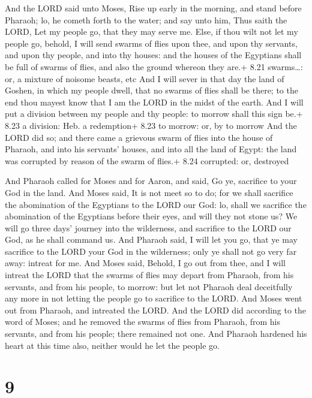  And the LORD said unto Moses, Rise up early in the
morning, and stand before Pharaoh; lo, he cometh forth to the water; and
say unto him, Thus saith the LORD, Let my people go, that they may serve
me.  Else, if thou wilt not let my people go, behold, I
will send swarms of flies upon thee, and upon thy servants, and upon thy
people, and into thy houses: and the houses of the Egyptians shall be
full of swarms of flies, and also the ground whereon they are.+ 8.21
swarms\ldots: or, a mixture of noisome beasts, etc  And I
will sever in that day the land of Goshen, in which my people dwell,
that no swarms of flies shall be there; to the end thou mayest know that
I am the LORD in the midst of the earth.  And I will put a
division between my people and thy people: to morrow shall this sign
be.+ 8.23 a division: Heb. a redemption+ 8.23 to morrow: or, by to
morrow  And the LORD did so; and there came a grievous
swarm of flies into the house of Pharaoh, and into his servants' houses,
and into all the land of Egypt: the land was corrupted by reason of the
swarm of flies.+ 8.24 corrupted: or, destroyed

 And Pharaoh called for Moses and for Aaron, and said, Go
ye, sacrifice to your God in the land.  And Moses said, It
is not meet so to do; for we shall sacrifice the abomination of the
Egyptians to the LORD our God: lo, shall we sacrifice the abomination of
the Egyptians before their eyes, and will they not stone us?
 We will go three days' journey into the wilderness, and
sacrifice to the LORD our God, as he shall command us.  And
Pharaoh said, I will let you go, that ye may sacrifice to the LORD your
God in the wilderness; only ye shall not go very far away: intreat for
me.  And Moses said, Behold, I go out from thee, and I will
intreat the LORD that the swarms of flies may depart from Pharaoh, from
his servants, and from his people, to morrow: but let not Pharaoh deal
deceitfully any more in not letting the people go to sacrifice to the
LORD.  And Moses went out from Pharaoh, and intreated the
LORD.  And the LORD did according to the word of Moses; and
he removed the swarms of flies from Pharaoh, from his servants, and from
his people; there remained not one.  And Pharaoh hardened
his heart at this time also, neither would he let the people go.

\hypertarget{section-8}{%
\section{9}\label{section-8}}

